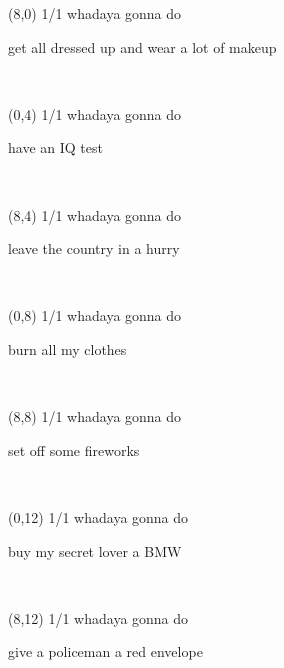 \documentclass[a4paper]{article}
\newcommand{\mycard}[5]{%
	\vspace{0.1cm}
	\small #1 #2
	\par
	\parbox[t][6.7cm][c]{9.5cm}{%
	\hspace{0.1cm} \Large#3\\
	\normalsize#4 #5
	}
}
\begin{document}
\begin{textblock}{8}(8,0)
\mycard{1/1}{whadaya gonna do}{\parbox{9.0cm}{
get all dressed up and wear a lot of makeup
}}{}{} 
\end{textblock}

\begin{textblock}{8}(0,4)
\mycard{1/1}{whadaya gonna do}{\parbox{9.0cm}{
have an IQ test
}}{}{} 
\end{textblock}

\begin{textblock}{8}(8,4)
\mycard{1/1}{whadaya gonna do}{\parbox{9.0cm}{
leave the country in a hurry
}}{}{} 
\end{textblock}

\begin{textblock}{8}(0,8)
\mycard{1/1}{whadaya gonna do}{\parbox{9.0cm}{
burn all my clothes
}}{}{} 
\end{textblock}

\begin{textblock}{8}(8,8)
\mycard{1/1}{whadaya gonna do}{\parbox{9.0cm}{
set off some fireworks
}}{}{} 
\end{textblock}

\begin{textblock}{8}(0,12)
\mycard{1/1}{whadaya gonna do}{\parbox{9.0cm}{
buy my secret lover a BMW
}}{}{} 
\end{textblock}

\begin{textblock}{8}(8,12)
\mycard{1/1}{whadaya gonna do}{\parbox{9.0cm}{
give a policeman a red envelope
}}{}{} 
\end{textblock}
\end{document}
